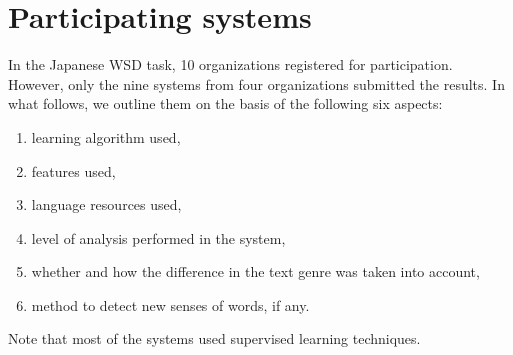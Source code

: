 \documentclass[english]{jnlp_1.4}
\begin{document}
\section{Participating systems}

In the Japanese WSD task, 10 organizations registered for
participation. However, only the nine systems from four
organizations submitted the results. In what follows, we outline them
on the basis of the following six aspects:
\begin{enumerate}
\item learning algorithm used,
\item features used,
\item language resources used,
\item level of analysis performed in the system,
\item whether and how the difference in the text genre was taken into account,
\item method to detect new senses of words, if any.
\end{enumerate}
Note that most of the systems used supervised learning techniques.
\end{document}
